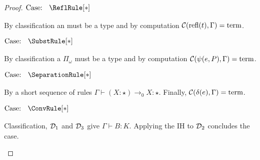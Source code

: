 \begin{proof}
    $\text{Case: }\begin{array}{c} \ReflRule[*] \end{array}$
    \begin{proofcase}
        By classification an  must be a type and by computation $\mathcal{C}(\text{refl}(t), \Gamma) = \mbox{\normalfont term}$.
    \end{proofcase}

    $\text{Case: }\begin{array}{c} \SubstRule[*] \end{array}$
    \begin{proofcase}
        By classification a $\Pi_\omega$ must be a type and by computation $\mathcal{C}(\psi(e, P), \Gamma) = \mbox{\normalfont term}$.
    \end{proofcase}

    $\text{Case: }\begin{array}{c} \SeparationRule[*] \end{array}$
    \begin{proofcase}
        By a short sequence of rules $\Gamma \vdash (X : \star) \to_0 X : \star$.
        Finally, $\mathcal{C}(\delta(e), \Gamma) = \mbox{\normalfont term}$.
    \end{proofcase}

    $\text{Case: }\begin{array}{c} \ConvRule[*] \end{array}$
    \begin{proofcase}
        Classification, $\mathcal{D}_{1}$ and $\mathcal{D}_{3}$ give $\Gamma \vdash B : K$.
        Applying the IH to $\mathcal{D}_{2}$ concludes the case.
    \end{proofcase}
\end{proof}
